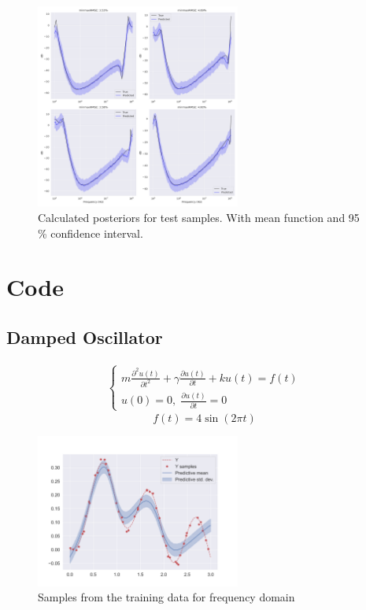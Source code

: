 \documentclass{article}
\begin{document}
\begin{figure}[htbp!]
    \centering
    \includegraphics[width=0.6\textwidth]{plots/prediction_transformer.png}
    \caption{Calculated posteriors for test samples. With mean function and 95 \% confidence interval.}
    \label{fig:training_samples}
\end{figure}
\section{Code}
%

\subsection{Damped Oscillator}
\begin{equation}
    \begin{aligned}
    {\displaystyle {\begin{cases}
        m\frac{\partial^2 u(t)}{\partial t^2} + \gamma \frac{\partial u(t)}{\partial t} + k u(t) = f(t) \\ u(0) = 0, \; \frac{\partial u(t)}{\partial t} = 0\end{cases}}}
    \end{aligned}
\end{equation}
\begin{equation}
    f(t) = 4 \sin(2\pi t)
\end{equation}
\begin{figure}[h]
    \centering
    \includegraphics[width=0.6\textwidth]{plots/bnn_oscilator1.png}
    \caption{Samples from the training data for frequency domain}
    \label{fig:training_samples}
\end{figure}
\end{document}
